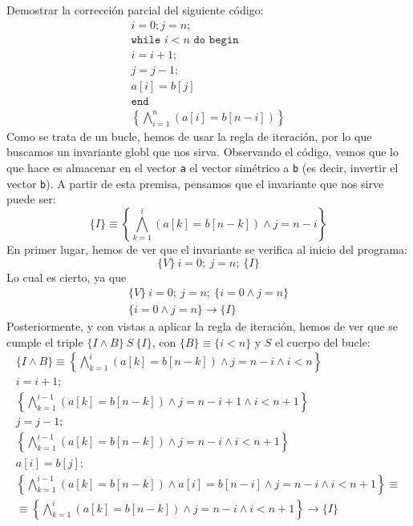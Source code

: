 \begin{ejercicio}
    Demostrar la corrección parcial del siguiente código:
    \begin{gather*}
        i = 0; j= n; \\
        \texttt{while\ } i < n \texttt{\ do\ begin} \\
        i = i + 1; \\
        j = j - 1; \\
        a[i] = b[j] \\
        \texttt{end} \\
        \left\{\bigwedge_{i=1}^n(a[i] = b[n-i])\right\}
    \end{gather*}
    Como se trata de un bucle, hemos de usar la regla de iteración, por lo que buscamos un invariante globl que nos sirva. Observando el código, vemos que lo que hace es almacenar en el vector \verb|a| el vector simétrico a \verb|b| (es decir, invertir el vector \verb|b|). A partir de esta premisa, pensamos que el invariante que nos sirve puede ser:
    \begin{equation*}
        \{I\} \equiv \left\{\bigwedge_{k=1}^{i}(a[k] = b[n-k]) \land j = n-i\right\}
    \end{equation*}
    En primer lugar, hemos de ver que el invariante se verifica al inicio del programa:
    \begin{equation*}
        \{V\}\ i=0;\ j=n;\ \{I\}
    \end{equation*}
    Lo cual es cierto, ya que
    \begin{gather*}
        \{V\}\ i=0;\ j=n;\ \{i = 0 \land j = n\} \\
        \{i = 0 \land j = n\} \rightarrow \{I\}
    \end{gather*}
    Posteriormente, y con vistas a aplicar la regla de iteración, hemos de ver que se cumple el triple $\{I \land B\}\ S\ \{I\}$, con $\{B\} \equiv \{i < n\}$ y $S$ el cuerpo del bucle:
    \begin{gather*}
        \{I \land B\} \equiv \left\{\bigwedge_{k=1}^{i}(a[k] = b[n-k]) \land j = n-i \land i <n\right\} \\
        i = i + 1; \\
        \left\{\bigwedge_{k=1}^{i-1}(a[k] = b[n-k]) \land j = n-i+1 \land i < n+1\right\} \\
        j = j - 1; \\
        \left\{\bigwedge_{k=1}^{i-1}(a[k] = b[n-k]) \land j = n-i \land i < n+1\right\} \\
        a[i] = b[j]; \\
        \left\{\bigwedge_{k=1}^{i-1}(a[k] = b[n-k]) \land a[i] = b[n-i] \land j = n-i \land i < n+1\right\} \equiv \\
        \equiv \left\{\bigwedge_{k=1}^{i}(a[k] = b[n-k]) \land j = n-i \land i < n+1\right\}\rightarrow \{I\}
    \end{gather*}


\end{ejercicio}
